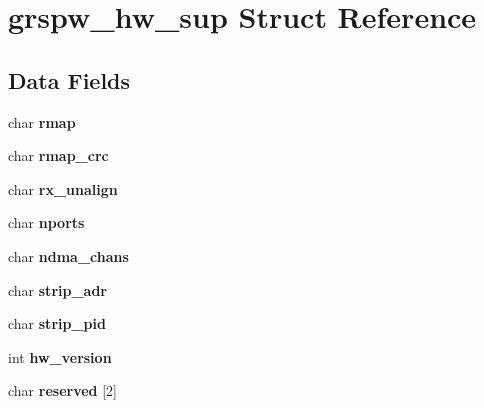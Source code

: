 \hypertarget{structgrspw__hw__sup}{}\section{grspw\+\_\+hw\+\_\+sup Struct Reference}
\label{structgrspw__hw__sup}
\subsection*{Data Fields}
\begin{DoxyCompactItemize}
\item 
\mbox{\label{structgrspw__hw__sup_aa41f57ccdcbbf3ed8b1c9e5198682682}} 
char {\bfseries rmap}
\item 
\mbox{\label{structgrspw__hw__sup_a3af86cd62fba3fc55aa232ae1181ad7b}} 
char {\bfseries rmap\+\_\+crc}
\item 
\mbox{\label{structgrspw__hw__sup_a8918b087a7e9b3448e4278f6658d7ad0}} 
char {\bfseries rx\+\_\+unalign}
\item 
\mbox{\label{structgrspw__hw__sup_a5eca0710cc203e3c9be5d0dabe81cc12}} 
char {\bfseries nports}
\item 
\mbox{\label{structgrspw__hw__sup_a5f758513d06a4b1bc3142a34c22a3425}} 
char {\bfseries ndma\+\_\+chans}
\item 
\mbox{\label{structgrspw__hw__sup_a3dc640a72e6eb08098454bc00328c9b8}} 
char {\bfseries strip\+\_\+adr}
\item 
\mbox{\label{structgrspw__hw__sup_a2f751114c052649da1de57c0d1a57d60}} 
char {\bfseries strip\+\_\+pid}
\item 
\mbox{\label{structgrspw__hw__sup_a6ae320fe25adb114be7bdac0a0616d46}} 
int {\bfseries hw\+\_\+version}
\item 
\mbox{\label{structgrspw__hw__sup_a1ed7fb16085196c5461a0b7a504e12e1}} 
char {\bfseries reserved} \mbox{[}2\mbox{]}
\item 
\mbox{\label{structgrspw__hw__sup_a0cb60b8d6545539293ca0a6b6a634c4e}} 

\end{DoxyCompactItemize}
